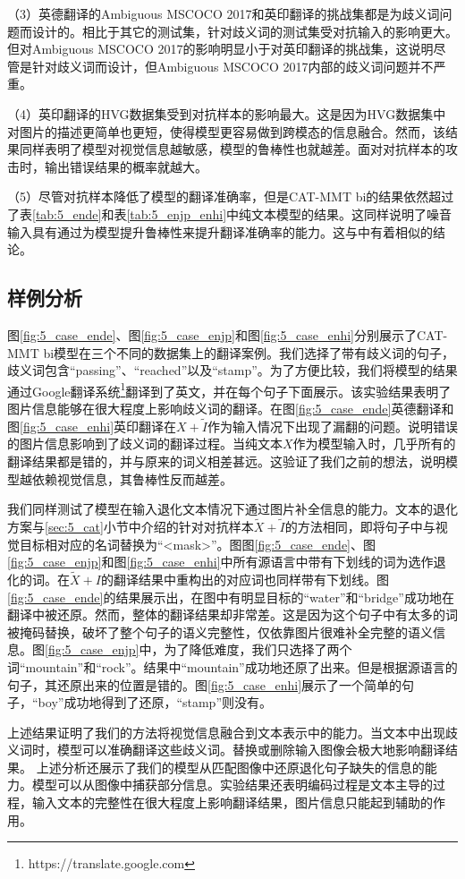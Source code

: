 （3）英德翻译的Ambiguous MSCOCO 2017和英印翻译的挑战集都是为歧义词问题而设计的。相比于其它的测试集，针对歧义词的测试集受对抗输入的影响更大。但对Ambiguous MSCOCO 2017的影响明显小于对英印翻译的挑战集，这说明尽管是针对歧义词而设计，但Ambiguous MSCOCO 2017内部的歧义词问题并不严重。

（4）英印翻译的HVG数据集受到对抗样本的影响最大。这是因为HVG数据集中对图片的描述更简单也更短，使得模型更容易做到跨模态的信息融合。然而，该结果同样表明了模型对视觉信息越敏感，模型的鲁棒性也就越差。面对对抗样本的攻击时，输出错误结果的概率就越大。

（5）尽管对抗样本降低了模型的翻译准确率，但是CAT-MMT bi的结果依然超过了表\ref{tab:5_ende}和表\ref{tab:5_enjp_enhi}中纯文本模型的结果。这同样说明了噪音输入具有通过为模型提升鲁棒性来提升翻译准确率的能力。这与中有着相似的结论。


\subsection{样例分析}
图\ref{fig:5_case_ende}、图\ref{fig:5_case_enjp}和图\ref{fig:5_case_enhi}分别展示了CAT-MMT bi模型在三个不同的数据集上的翻译案例。我们选择了带有歧义词的句子，歧义词包含“passing”、“reached”以及“stamp”。为了方便比较，我们将模型的结果通过Google翻译系统\footnote{https://translate.google.com}翻译到了英文，并在每个句子下面展示。该实验结果表明了图片信息能够在很大程度上影响歧义词的翻译。在图\ref{fig:5_case_ende}英德翻译和图\ref{fig:5_case_enhi}英印翻译在$X+\tilde{I}$作为输入情况下出现了漏翻的问题。说明错误的图片信息影响到了歧义词的翻译过程。当纯文本$X$作为模型输入时，几乎所有的翻译结果都是错的，并与原来的词义相差甚远。这验证了我们之前的想法，说明模型越依赖视觉信息，其鲁棒性反而越差。




我们同样测试了模型在输入退化文本情况下通过图片补全信息的能力。文本的退化方案与\ref{sec:5_cat}小节中介绍的针对对抗样本$\tilde{X}+\tilde{I}$的方法相同，即将句子中与视觉目标相对应的名词替换为“<mask>”。图图\ref{fig:5_case_ende}、图\ref{fig:5_case_enjp}和图\ref{fig:5_case_enhi}中所有源语言中带有下划线的词为选作退化的词。在$\tilde{X}+I$的翻译结果中重构出的对应词也同样带有下划线。图\ref{fig:5_case_ende}的结果展示出，在图中有明显目标的“water”和“bridge”成功地在翻译中被还原。然而，整体的翻译结果却非常差。这是因为这个句子中有太多的词被掩码替换，破坏了整个句子的语义完整性，仅依靠图片很难补全完整的语义信息。图\ref{fig:5_case_enjp}中，为了降低难度，我们只选择了两个词“mountain”和“rock”。结果中“mountain”成功地还原了出来。但是根据源语言的句子，其还原出来的位置是错的。图\ref{fig:5_case_enhi}展示了一个简单的句子，“boy”成功地得到了还原，“stamp”则没有。

上述结果证明了我们的方法将视觉信息融合到文本表示中的能力。当文本中出现歧义词时，模型可以准确翻译这些歧义词。替换或删除输入图像会极大地影响翻译结果。
上述分析还展示了我们的模型从匹配图像中还原退化句子缺失的信息的能力。模型可以从图像中捕获部分信息。实验结果还表明编码过程是文本主导的过程，输入文本的完整性在很大程度上影响翻译结果，图片信息只能起到辅助的作用。